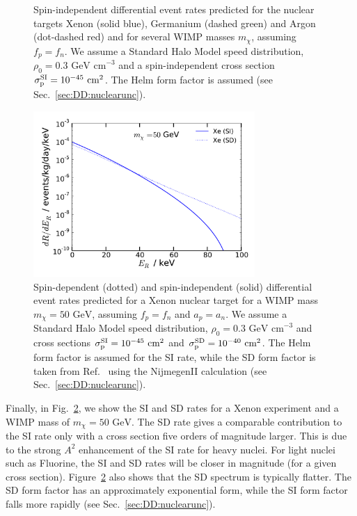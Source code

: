 \begin{figure}[p]
  \caption[Examples of spin-independent event spectra for direct detection experiments]{Spin-independent differential event rates predicted for the nuclear targets Xenon (solid blue), Germanium (dashed green) and Argon (dot-dashed red) and for several WIMP masses $m_\chi$, assuming $f_p = f_n$. We assume a Standard Halo Model speed distribution, $\rho_0 = 0.3 \textrm{ GeV cm}^{-3}$ and a spin-independent cross section $\sigmapsi = 10^{-45} \textrm{ cm}^2$. The Helm form factor \cite{Helm:1956} is assumed (see Sec.~\ref{sec:DD:nuclearunc}).}
  \label{fig:DD:spectra}
\end{figure}

\begin{figure}[ht]
\centering
  \includegraphics[width=0.75\textwidth]{DirectDetection/SpectraSISD_50GeV.pdf}
  \caption[Comparison of spin-dependent and spin-independent rates for a Xenon experiment]{Spin-dependent (dotted) and spin-independent (solid) differential event rates predicted for a Xenon nuclear target for a WIMP mass $m_\chi = 50 \textrm{ GeV}$, assuming $f_p = f_n$ and $a_p = a_n$. We assume a Standard Halo Model speed distribution, $\rho_0 = 0.3 \textrm{ GeV cm}^{-3}$ and cross sections $\sigmapsi = 10^{-45} \textrm{ cm}^2$ and $\sigmapsd = 10^{-40} \textrm{ cm}^2$. The Helm form factor \cite{Helm:1956} is assumed for the SI rate, while the SD form factor is taken from Ref.~\cite{Ressell:1997} using the NijmegenII calculation (see Sec.~\ref{sec:DD:nuclearunc}).}
  \label{fig:DD:spectraSISD}
\end{figure}


Finally, in Fig.~\ref{fig:DD:spectraSISD}, we show the SI and SD rates for a Xenon experiment and a WIMP mass of $m_\chi = 50 \textrm{ GeV}$. The SD rate gives a comparable contribution to the SI rate only with a cross section five orders of magnitude larger. This is due to the strong $A^2$ enhancement of the SI rate for heavy nuclei. For light nuclei such as Fluorine, the SI and SD rates will be closer in magnitude (for a given cross section). Figure~\ref{fig:DD:spectraSISD} also shows that the SD spectrum is typically flatter. The SD form factor has an approximately exponential form, while the SI form factor falls more rapidly (see Sec.~\ref{sec:DD:nuclearunc}). 

